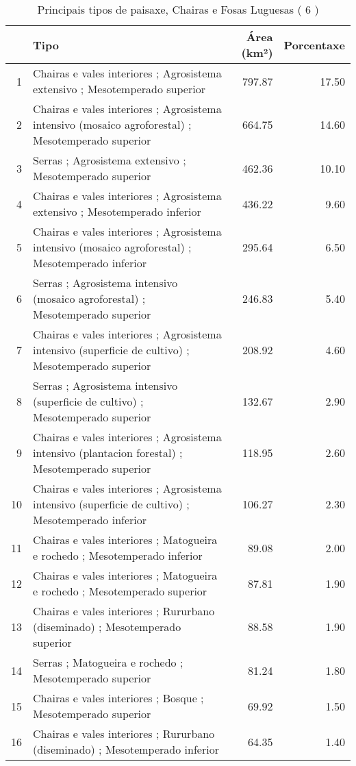 \begin{table}[p]
\centering
\caption{Principais tipos de paisaxe,  Chairas e Fosas Luguesas ( 6 )} 
\label{Tipos 6}
\begin{tabular}{rlrr}
  \hline
 & Tipo & Área (km²) & Porcentaxe \\ 
  \hline
1 & Chairas e vales interiores ; Agrosistema extensivo ; Mesotemperado superior & 797.87 & 17.50 \\ 
  2 & Chairas e vales interiores ; Agrosistema intensivo (mosaico agroforestal) ; Mesotemperado superior & 664.75 & 14.60 \\ 
  3 & Serras ; Agrosistema extensivo ; Mesotemperado superior & 462.36 & 10.10 \\ 
  4 & Chairas e vales interiores ; Agrosistema extensivo ; Mesotemperado inferior & 436.22 & 9.60 \\ 
  5 & Chairas e vales interiores ; Agrosistema intensivo (mosaico agroforestal) ; Mesotemperado inferior & 295.64 & 6.50 \\ 
  6 & Serras ; Agrosistema intensivo (mosaico agroforestal) ; Mesotemperado superior & 246.83 & 5.40 \\ 
  7 & Chairas e vales interiores ; Agrosistema intensivo (superficie de cultivo) ; Mesotemperado superior & 208.92 & 4.60 \\ 
  8 & Serras ; Agrosistema intensivo (superficie de cultivo) ; Mesotemperado superior & 132.67 & 2.90 \\ 
  9 & Chairas e vales interiores ; Agrosistema intensivo (plantacion forestal) ; Mesotemperado superior & 118.95 & 2.60 \\ 
  10 & Chairas e vales interiores ; Agrosistema intensivo (superficie de cultivo) ; Mesotemperado inferior & 106.27 & 2.30 \\ 
  11 & Chairas e vales interiores ; Matogueira e rochedo ; Mesotemperado inferior & 89.08 & 2.00 \\ 
  12 & Chairas e vales interiores ; Matogueira e rochedo ; Mesotemperado superior & 87.81 & 1.90 \\ 
  13 & Chairas e vales interiores ; Rururbano (diseminado) ; Mesotemperado superior & 88.58 & 1.90 \\ 
  14 & Serras ; Matogueira e rochedo ; Mesotemperado superior & 81.24 & 1.80 \\ 
  15 & Chairas e vales interiores ; Bosque ; Mesotemperado superior & 69.92 & 1.50 \\ 
  16 & Chairas e vales interiores ; Rururbano (diseminado) ; Mesotemperado inferior & 64.35 & 1.40 \\ 

\end{tabular}
\end{table}
